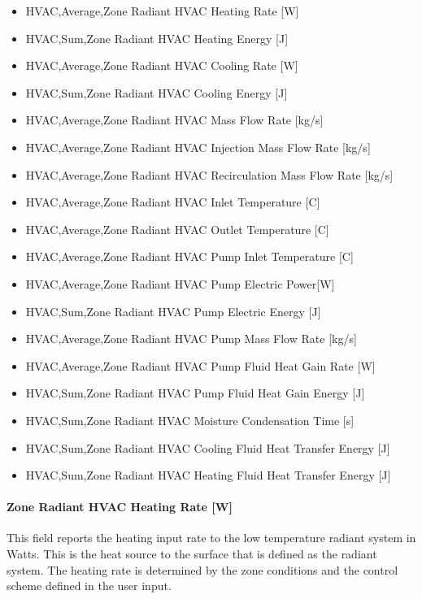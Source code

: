 \begin{itemize}
\item
  HVAC,Average,Zone Radiant HVAC Heating Rate {[}W{]}
\item
  HVAC,Sum,Zone Radiant HVAC Heating Energy {[}J{]}
\item
  HVAC,Average,Zone Radiant HVAC Cooling Rate {[}W{]}
\item
  HVAC,Sum,Zone Radiant HVAC Cooling Energy {[}J{]}
\item
  HVAC,Average,Zone Radiant HVAC Mass Flow Rate {[}kg/s{]}
\item
  HVAC,Average,Zone Radiant HVAC Injection Mass Flow Rate {[}kg/s{]}
\item
  HVAC,Average,Zone Radiant HVAC Recirculation Mass Flow Rate {[}kg/s{]}
\item
  HVAC,Average,Zone Radiant HVAC Inlet Temperature {[}C{]}
\item
  HVAC,Average,Zone Radiant HVAC Outlet Temperature {[}C{]}
\item
  HVAC,Average,Zone Radiant HVAC Pump Inlet Temperature {[}C{]}
\item
  HVAC,Average,Zone Radiant HVAC Pump Electric Power{[}W{]}
\item
  HVAC,Sum,Zone Radiant HVAC Pump Electric Energy {[}J{]}
\item
  HVAC,Average,Zone Radiant HVAC Pump Mass Flow Rate {[}kg/s{]}
\item
  HVAC,Average,Zone Radiant HVAC Pump Fluid Heat Gain Rate {[}W{]}
\item
  HVAC,Sum,Zone Radiant HVAC Pump Fluid Heat Gain Energy {[}J{]}
\item
  HVAC,Sum,Zone Radiant HVAC Moisture Condensation Time {[}s{]}
\item
  HVAC,Sum,Zone Radiant HVAC Cooling Fluid Heat Transfer Energy {[}J{]}
\item
  HVAC,Sum,Zone Radiant HVAC Heating Fluid Heat Transfer Energy {[}J{]}
\end{itemize}

\paragraph{Zone Radiant HVAC Heating Rate {[}W{]}}\label{zone-radiant-hvac-heating-rate-w-1}

This field reports the heating input rate to the low temperature radiant system in Watts. This is the heat source to the surface that is defined as the radiant system. The heating rate is determined by the zone conditions and the control scheme defined in the user input.

